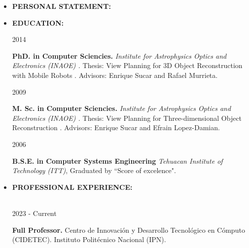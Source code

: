 \documentclass[10pt]{article}
\begin{document}
\begin{itemize}

\item{\bf PERSONAL STATEMENT:}
	

	
\item{\bf EDUCATION:}

\begin{minipage}{1.5 in}
	2014\\
\end{minipage}
\begin{minipage}{4.5in}
	\textbf{PhD. in Computer Sciencies.} \textit{Institute for Astrophysics Optics and
	Electronics (INAOE) \href{https://www.inaoep.mx/}{\faExternalLink}.} Thesis: View Planning for 3D Object Reconstruction with Mobile Robots \href{https://jivasquez.files.wordpress.com/2015/03/tesis-doctorado.pdf}{\faFilePdfO}. Advisors: Enrique Sucar and Rafael Murrieta.\\ 
\end{minipage}


\begin{minipage}{1.5 in}
	2009\\
\end{minipage}
\begin{minipage}{4.5in}
	\textbf{M. Sc. in Computer Sciencies.} \textit{Institute for Astrophysics Optics and
		Electronics (INAOE) \href{https://www.inaoep.mx/}{\faExternalLink}.} Thesis: View Planning for Three-dimensional Object Reconstruction \href{https://jivasquez.files.wordpress.com/2015/03/tesis-maestria.pdf}{\faFilePdfO}. Advisors: Enrique Sucar and Efrain Lopez-Damian.\\ 
\end{minipage}

\begin{minipage}{1.5 in}
	2006\\
\end{minipage}
\begin{minipage}{4.5in}
	\textbf{B.S.E. in Computer Systems Engineering} \textit{Tehuacan Institute of Technology (ITT)}, Graduated by ``Score of excelence".\\ 
\end{minipage}

\item {\bf PROFESSIONAL EXPERIENCE:} \\\\

\begin{minipage}{1.5 in}
	2023 - Current\\
\end{minipage}
\begin{minipage}{4.5in}
	\textbf{Full Professor.} Centro de Innovación y Desarrollo Tecnológico en Cómputo (CIDETEC). Instituto Politécnico Nacional (IPN).\\ 
\end{minipage}


\end{itemize}
\end{document}
